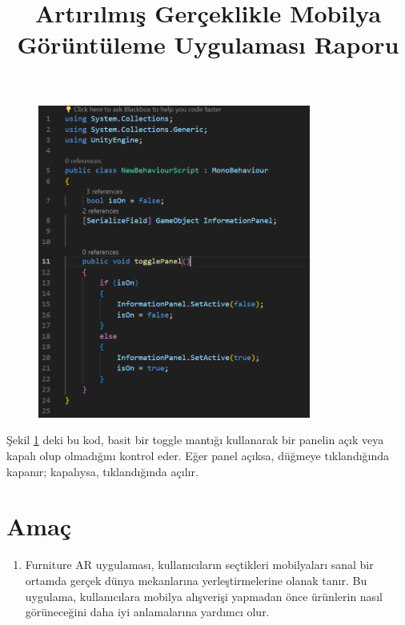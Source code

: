 \documentclass[12pt, a4paper]{article}
\begin{document}
	\begin{figure}[!ht]
		\caption{}
		\centering
		\includegraphics[width=0.8\textwidth]{dinoAR2.PNG}
		
		\label{dino2}
	\end{figure}
	Şekil \ref{dino2} deki bu kod, basit bir toggle mantığı kullanarak bir panelin açık veya kapalı olup olmadığını kontrol eder. Eğer panel açıksa, düğmeye tıklandığında kapanır; kapalıysa, tıklandığında açılır.\cite{GitHub}
	
	\title{Artırılmış Gerçeklikle Mobilya Görüntüleme Uygulaması Raporu}
	\author{}
	\date{}
	\maketitle
	\setcounter{section}{0}
	
	\section{Amaç}
	\begin{enumerate}
		\item Furniture AR uygulaması, kullanıcıların seçtikleri mobilyaları sanal bir ortamda gerçek dünya mekanlarına yerleştirmelerine olanak tanır. Bu uygulama, kullanıcılara mobilya alışverişi yapmadan önce ürünlerin nasıl görüneceğini daha iyi anlamalarına yardımcı olur.\cite{FurnishAR}
	\end{enumerate}
\end{document}
